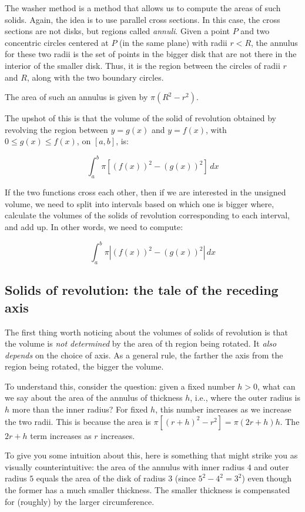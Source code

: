 \documentclass[10pt]{amsart}
\begin{document}
The washer method is a method that allows us to compute the areas of
such solids. Again, the idea is to use parallel cross sections. In
this case, the cross sections are not disks, but regions called {\em
annuli}. Given a point $P$ and two concentric circles centered at $P$
(in the same plane) with radii $r < R$, the annulus for these two
radii is the set of points in the bigger disk that are not there in
the interior of the smaller disk. Thus, it is the region between the
circles of radii $r$ and $R$, along with the two boundary circles.

The area of such an annulus is given by $\pi(R^2 - r^2)$.

The upshot of this is that the volume of the solid of revolution
obtained by revolving the region between $y = g(x)$ and $y = f(x)$,
with $0 \le g(x) \le f(x)$, on $[a,b]$, is:

$$\int_a^b \pi[(f(x))^2 - (g(x))^2 ] \, dx$$

If the two functions cross each other, then if we are interested in
the unsigned volume, we need to split into intervals based on which
one is bigger where, calculate the volumes of the solids of revolution
corresponding to each interval, and add up. In other words, we need to
compute:

$$\int_a^b \pi|(f(x))^2 - (g(x))^2| \, dx$$

\subsection{Solids of revolution: the tale of the receding axis}

The first thing worth noticing about the volumes of solids of
revolution is that the volume is {\em not determined} by the area of
th region being rotated. It {\em also depends} on the choice of
axis. As a general rule, the farther the axis from the region being
rotated, the bigger the volume.

To understand this, consider the question: given a fixed number $h >
0$, what can we say about the area of the annulus of thickness $h$,
i.e., where the outer radius is $h$ more than the inner radius? For
fixed $h$, this number increases as we increase the two radii. This is
because the area is $\pi[(r + h)^2 - r^2] = \pi(2r + h)h$. The $2r +
h$ term increases as $r$ increases.

To give you some intuition about this, here is something that might
strike you as visually counterintuitive: the area of the annulus with
inner radius $4$ and outer radius $5$ equals the area of the disk of
radius $3$ (since $5^2 - 4^2 = 3^2$) even though the former has a much
smaller thickness. The smaller thickness is compensated for (roughly)
by the larger circumference.
\end{document}
